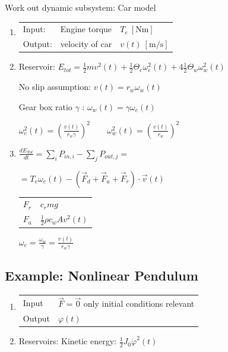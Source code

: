 \documentclass[10pt,a4paper]{scrartcl}
\begin{document}
\begin{multicols*}{3}

Work out dynamic subsystem: Car model
\begin{enumerate}
\item \begin{tabular}{lll}Input: & Engine torque & $T_e\ [\si{\newton\meter}]$\\
Output: & velocity of car & $v(t)\ [\si{\meter\per\second}]$ \end{tabular}
\item Reservoir: $E_{tot}=\frac{1}{2}mv^2(t)+\frac{1}{2}\Theta_e\omega_e^2(t)+4\frac{1}{2}\Theta_w\omega_w^2(t)$

No slip assumption: $v(t)=r_w\omega_w(t)$

Gear box ratio $\gamma$ : $\omega_w(t)=\gamma\omega_e(t)$

$\omega_e^2(t)=\left(\frac{v(t)}{r_w\gamma}\right)^2\qquad \omega_w^2(t)=\left(\frac{v(t)}{r_w}\right)^2$


\item $\frac{dE_{Tot}}{dt}=\sum\limits_iP_{in,i}-\sum\limits_jP_{out,j}=$

$=T_e\omega_e(t)-\left(\vec{F}_d+\vec{F}_a+\vec{F}_r\right)\cdot \vec{v}(t)$

\begin{tabular}{l@{ = }l}
$F_r$&$c_rmg$\\
$F_a$&$\frac{1}{2}\rho c_w A v^2(t)$
\end{tabular}\hfill $\omega_e=\frac{\omega_w}{\gamma}=\frac{v(t)}{r_w\gamma}$


\end{enumerate}



\subsection{Example: Nonlinear Pendulum}


\begin{enumerate}
\item \begin{tabular}{ll}Input & $\vec{F}=\vec{0}$ only initial conditions relevant\\Output & $\varphi(t)$ \end{tabular}
\item Reservoirs: Kinetic energy: $\frac{1}{2}J_0\dot{\varphi}^2(t)$


\end{enumerate}
\end{multicols*}
\end{document}
